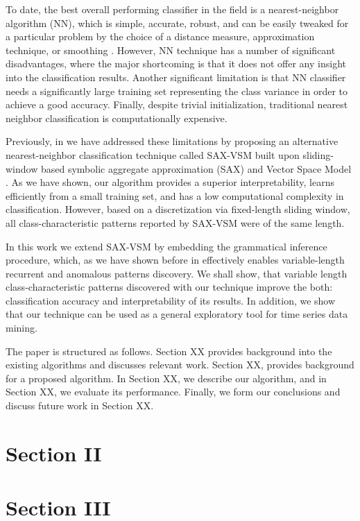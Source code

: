 \documentclass{llncs}
\begin{document}
To date, the best overall performing classifier in the field is a nearest-neighbor algorithm (NN), which is simple, accurate, robust, and can be easily tweaked for a particular problem by the choice of a distance measure, approximation technique, or smoothing \cite{review}. However, NN technique has a number of significant disadvantages, where the major shortcoming is that it does not
offer any insight into the classification results. Another significant limitation is that NN classifier needs a significantly large training set representing the class variance in order to achieve a good accuracy. Finally, despite trivial initialization, traditional nearest neighbor classification is computationally expensive. 

Previously, in \cite{sax-vsm} we have addressed these limitations by proposing an alternative nearest-neighbor classification technique called {SAX-VSM} built upon sliding-window based symbolic aggregate approximation (SAX) \cite{sax} and Vector Space Model \cite{vsm}. As we have shown, our algorithm provides a superior interpretability, learns efficiently from a small training set, and has a low computational complexity in classification. However, based on a discretization via fixed-length sliding window, all class-characteristic patterns reported by {SAX-VSM} were of the same length. 

In this work we extend {SAX-VSM} by embedding the grammatical inference procedure, which, as we have shown before in \cite{grammarviz}\cite{grammarviz2}\cite{grammaranomaly} effectively enables variable-length recurrent and anomalous patterns discovery. We shall show, that variable length class-characteristic patterns discovered with our technique improve the both: classification accuracy and interpretability of its results. In addition, we show that our technique can be used as a general exploratory tool for time series data mining.

The paper is structured as follows. Section XX provides background into the existing algorithms and discusses relevant work.
Section XX, provides background for a proposed algorithm.
In Section XX, we describe our algorithm, and in Section XX, we
evaluate its performance.
Finally, we form our conclusions and discuss future work
in Section XX.


\section{Section II}


\section{Section III}
\end{document}
